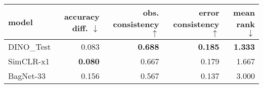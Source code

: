 \begin{tabular}{lrrrr}
\toprule
     model & accuracy diff. $\downarrow$ & obs. consistency $\uparrow$ & error consistency $\uparrow$ & mean rank $\downarrow$ \\
\midrule
DINO\_Test &                       0.083 &              \textbf{0.688} &               \textbf{0.185} &         \textbf{1.333} \\
 SimCLR-x1 &              \textbf{0.080} &                       0.667 &                        0.179 &                  1.667 \\
 BagNet-33 &                       0.156 &                       0.567 &                        0.137 &                  3.000 \\
\bottomrule
\end{tabular}

